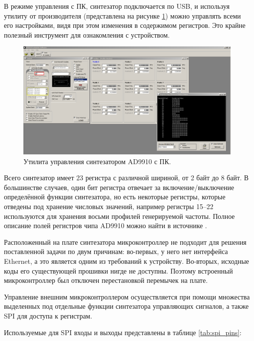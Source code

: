 \documentclass[rusmathsym, eqnumwithinsec, amspack, hyperref]{bomgost}
\begin{document}
В режиме управления с ПК, синтезатор подключается по USB, и используя утилиту от производителя (представлена на рисунке \ref{fig:ad9910_evaluation_software}) можно управлять всеми его настройками, видя при этом изменения в содержимом регистров. Это крайне полезный инструмент для ознакомления с устройством.

\begin{gostfigure}
\begin{figure}[H]
\centering
\includegraphics[scale=.25]{data/ad9910_evaluation_software.png}
\caption{Утилита управления синтезатором AD9910 с ПК.}
\label{fig:ad9910_evaluation_software}
\end{figure}
\end{gostfigure}

Всего синтезатор имеет 23 регистра с различной шириной, от 2 байт до 8 байт. В большинстве случаев, один бит регистра отвечает за включение/выключение определённой функции синтезатора, но есть некоторые регистры, которые отведены под хранение числовых значений, например регистры 15--22 используются для хранения восьми профилей генерируемой частоты. Полное описание полей регистров чипа AD9910 можно найти в источнике \cite{AD9910Datasheet}.

Расположенный на плате синтезатора микроконтроллер не подходит для решения поставленной задачи по двум причинам: во-первых, у него нет интерфейса Ethernet, а это является одним из требований к устройству. Во-вторых, исходные коды его существующей прошивки нигде не доступны. Поэтому встроенный микроконтроллер был отключен перестановкой перемычек на плате.

Управление внешним микроконтроллером осуществляется при помощи множества выделенных под отдельные функции синтезатора управляющих сигналов, а также SPI для доступа к регистрам.

Используемые для SPI входы и выходы представлены в таблице \ref{tab:spi_pins}:
\end{document}
